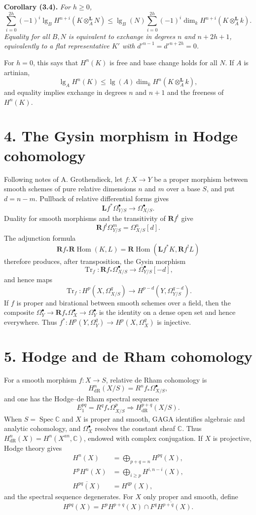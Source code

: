 \documentclass[11pt]{article}
\DeclareMathOperator{\Hom}{Hom}
\DeclareMathOperator{\Spec}{Spec}
\DeclareMathOperator{\Tr}{Tr}
\newcommand{\bR}{\mathbf R}
\newcommand{\bL}{\mathbf L}
\newcommand{\C}{\mathbb C}
\newcommand{\length}{\operatorname{lg}}
\newenvironment{named}[1]{\par\medskip\noindent\textbf{#1}\itshape}{\par\medskip}
\begin{document}
\begin{named}{Corollary (3.4).}
For $h\ge0$,
\[
\sum_{i=0}^{2h}(-1)^i\length_BH^{n+i}(K\otimes_A^\mathbf L N)
\le \length_B(N)\sum_{i=0}^{2h}(-1)^i\dim_kH^{n+i}(K\otimes_A^\mathbf L k).
\]
Equality for all $B,N$ is equivalent to exchange in degrees $n$ and $n+2h+1$, equivalently to a flat representative $K'$ with $d'^{n-1}=d'^{n+2h}=0$.
\end{named}
For $h=0$, this says that $H^n(K)$ is free and base change holds for all $N$. If $A$ is artinian,
\[
\length_AH^n(K)\le\length(A)\dim_kH^n(K\otimes_A^\mathbf L k),
\]
and equality implies exchange in degrees $n$ and $n+1$ and the freeness of $H^n(K)$.

\section*{4. The Gysin morphism in Hodge cohomology}
Following notes of A. Grothendieck, let $f:X\to Y$ be a proper morphism between smooth schemes of pure relative dimensions $n$ and $m$ over a base $S$, and put $d=n-m$. Pullback of relative differential forms gives
\[
\bL f^*\Omega^\bullet_{Y/S}\longrightarrow\Omega^\bullet_{X/S}.
\]
Duality for smooth morphisms and the transitivity of $\bR f^!$ give
\[
\bR f^!\Omega^m_{Y/S}=\Omega^n_{X/S}[d].
\]
The adjunction formula
\[
\bR f_*\bR\Hom(K,L)=\bR\Hom(\bL f^*K,\bR f^!L)
\]
therefore produces, after transposition, the Gysin morphism
\[
\Tr_f:\bR f_*\Omega^\bullet_{X/S}\longrightarrow \Omega^\bullet_{Y/S}[-d],
\]
and hence maps
\[
\Tr_f:H^p(X,\Omega^q_{X/S})\longrightarrow H^{p-d}(Y,\Omega^{q-d}_{Y/S}).
\]
If $f$ is proper and birational between smooth schemes over a field, then the composite $\Omega_Y^\bullet\to\bR f_*\Omega_X^\bullet\to\Omega_Y^\bullet$ is the identity on a dense open set and hence everywhere. Thus $f^*:H^p(Y,\Omega^q_Y)\to H^p(X,\Omega^q_X)$ is injective.

\section*{5. Hodge and de Rham cohomology}
For a smooth morphism $f:X\to S$, relative de Rham cohomology is
\[
H^n_{\mathrm{dR}}(X/S)=R^nf_*\Omega^\bullet_{X/S},
\]
and one has the Hodge--de Rham spectral sequence
\begin{equation}\tag{5.1.1}
E_1^{pq}=R^qf_*\Omega^p_{X/S}\Longrightarrow H^{p+q}_{\mathrm{dR}}(X/S).
\end{equation}
When $S=\Spec\C$ and $X$ is proper and smooth, GAGA identifies algebraic and analytic cohomology, and $\Omega_X^\bullet$ resolves the constant sheaf $\C$. Thus $H^n_{\mathrm{dR}}(X)=H^n(X^{an},\C)$, endowed with complex conjugation. If $X$ is projective, Hodge theory gives
\begin{align}\tag{5.2.2}
H^n(X)&=\bigoplus_{p+q=n}H^{pq}(X),\\
\tag{5.2.3}F^pH^n(X)&=\bigoplus_{i\ge p}H^{i,n-i}(X),\\
\tag{5.2.4}\overline{H^{pq}(X)}&=H^{qp}(X),
\end{align}
and the spectral sequence degenerates. For $X$ only proper and smooth, define
\[
H^{pq}(X)=F^pH^{p+q}(X)\cap\overline{F^qH^{p+q}(X)}.
\]
\end{document}
